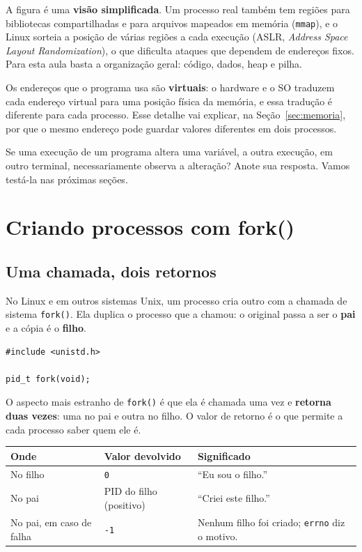 \documentclass[11pt,a4paper]{article}
\newcommand{\cmd}[1]{\texttt{#1}}
\begin{document}
A figura é uma \textbf{visão simplificada}. Um processo real também tem regiões para bibliotecas compartilhadas e para arquivos mapeados em memória (\cmd{mmap}), e o Linux sorteia a posição de várias regiões a cada execução (ASLR, \emph{Address Space Layout Randomization}), o que dificulta ataques que dependem de endereços fixos. Para esta aula basta a organização geral: código, dados, heap e pilha.

Os endereços que o programa usa são \textbf{virtuais}: o hardware e o SO traduzem cada endereço virtual para uma posição física da memória, e essa tradução é diferente para cada processo. Esse detalhe vai explicar, na Seção~\ref{sec:memoria}, por que o mesmo endereço pode guardar valores diferentes em dois processos.

\begin{pergunta}
Se uma execução de um programa altera uma variável, a outra execução, em outro terminal, necessariamente observa a alteração? Anote sua resposta. Vamos testá-la nas próximas seções.
\end{pergunta}

\section{Criando processos com fork()}

\subsection{Uma chamada, dois retornos}

No Linux e em outros sistemas Unix, um processo cria outro com a chamada de sistema \cmd{fork()}. Ela duplica o processo que a chamou: o original passa a ser o \textbf{pai} e a cópia é o \textbf{filho}.

\begin{lstlisting}[style=codigo]
#include <unistd.h>

pid_t fork(void);
\end{lstlisting}

O aspecto mais estranho de \cmd{fork()} é que ela é chamada uma vez e \textbf{retorna duas vezes}: uma no pai e outra no filho. O valor de retorno é o que permite a cada processo saber quem ele é.

\begin{center}
\begin{tabular}{@{}lll@{}}
\toprule
\textbf{Onde} & \textbf{Valor devolvido} & \textbf{Significado} \\
\midrule
No filho & \cmd{0} & ``Eu sou o filho.'' \\
No pai & PID do filho (positivo) & ``Criei este filho.'' \\
No pai, em caso de falha & \cmd{-1} & Nenhum filho foi criado; \cmd{errno} diz o motivo. \\
\bottomrule
\end{tabular}
\end{center}
\end{document}
